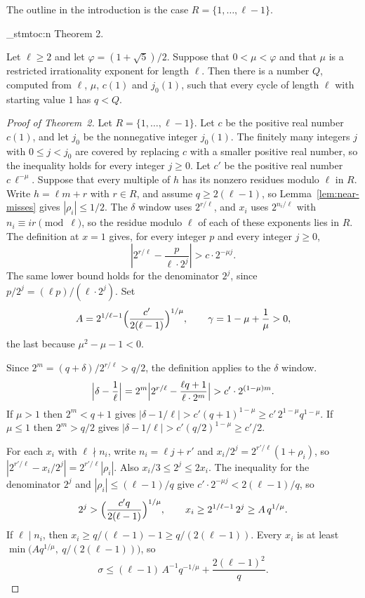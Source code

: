 \documentclass[11pt]{article}
\newenvironment{named}[1]{%
  \par\addvspace{\medskipamount}%
  \pagebreak[3]%
  \noindent{\bfseries #1}\space\ignorespaces
  \stmtoc{#1}%
}{\par\addvspace{\medskipamount}}
\newcommand{\stmtoc}[1]{ \qn_stmtoc:n {#1} }
\begin{document}
The outline in the introduction is the case $R = \{1, \ldots, \ell-1\}$.

\begin{named}{Theorem 2.}
Let $\ell \ge 2$ and let $\varphi = (1 + \sqrt{5})/2$.
Suppose that $0 < \mu < \varphi$ and that $\mu$ is a restricted irrationality exponent for length $\ell$.
Then there is a number $Q$, computed from $\ell$, $\mu$, $c(1)$ and $j_0(1)$, such that every cycle of length $\ell$ with starting value $1$ has $q < Q$.
\end{named}

\begin{proof}[Proof of Theorem~2]
Let $R = \{1, \ldots, \ell-1\}$.
Let $c$ be the positive real number $c(1)$, and let $j_0$ be the nonnegative integer $j_0(1)$.
The finitely many integers $j$ with $0 \le j < j_0$ are covered by replacing $c$ with a smaller positive real number, so the inequality holds for every integer $j \ge 0$.
Let $c'$ be the positive real number $c\, \ell^{-\mu}$.
Suppose that every multiple of $h$ has its nonzero residues modulo $\ell$ in $R$.
Write $h = \ell m + r$ with $r \in R$, and assume $q \ge 2(\ell-1)$, so Lemma~\ref{lem:near-misses} gives $|\rho_i| \le 1/2$.
The $\delta$ window uses $2^{r/\ell}$, and $x_i$ uses $2^{n_i/\ell}$ with $n_i \equiv ir \pmod{\ell}$, so the residue modulo $\ell$ of each of these exponents lies in $R$.
The definition at $x = 1$ gives, for every integer $p$ and every integer $j \ge 0$,
\[
\left| 2^{r/\ell} - \frac{p}{\ell \cdot 2^j} \right| > c \cdot 2^{-\mu j}.
\]
The same lower bound holds for the denominator $2^j$, since $p/2^j = (\ell p)/(\ell \cdot 2^j)$.
Set
\[
A = 2^{1/\ell - 1}\Bigl(\frac{c'}{2(\ell-1)}\Bigr)^{1/\mu},
\qquad
\gamma = 1 - \mu + \frac1\mu > 0,
\]
the last because $\mu^2 - \mu - 1 < 0$.

Since $2^m = (q+\delta)/2^{r/\ell} > q/2$, the definition applies to the $\delta$ window.
\[
\Bigl|\delta - \frac1\ell\Bigr|
= 2^m \Bigl| 2^{r/\ell} - \frac{\ell q + 1}{\ell \cdot 2^m} \Bigr|
> c' \cdot 2^{(1-\mu)m}.
\]
If $\mu > 1$ then $2^m < q+1$ gives $|\delta - 1/\ell| > c'(q+1)^{1-\mu} \ge c'\, 2^{1-\mu} q^{1-\mu}$.
If $\mu \le 1$ then $2^m > q/2$ gives $|\delta - 1/\ell| > c'(q/2)^{1-\mu} \ge c'/2$.

For each $x_i$ with $\ell \nmid n_i$, write $n_i = \ell j + r'$ and $x_i/2^j = 2^{r'/\ell}(1+\rho_i)$, so $|2^{r'/\ell} - x_i/2^j| = 2^{r'/\ell}|\rho_i|$.
Also $x_i/3 \le 2^j \le 2x_i$.
The inequality for the denominator $2^j$ and $|\rho_i| \le (\ell-1)/q$ give $c' \cdot 2^{-\mu j} < 2(\ell-1)/q$, so
\[
2^j > \Bigl(\frac{c'q}{2(\ell-1)}\Bigr)^{1/\mu},
\qquad
x_i \ge 2^{1/\ell-1}\, 2^j \ge A\, q^{1/\mu}.
\]
If $\ell \mid n_i$, then $x_i \ge q/(\ell-1) - 1 \ge q/(2(\ell-1))$.
Every $x_i$ is at least $\min\bigl(A q^{1/\mu},\ q/(2(\ell-1))\bigr)$, so
\[
\sigma \le (\ell-1)\, A^{-1} q^{-1/\mu} + \frac{2(\ell-1)^2}{q}.
\]


\end{proof}
\end{document}
